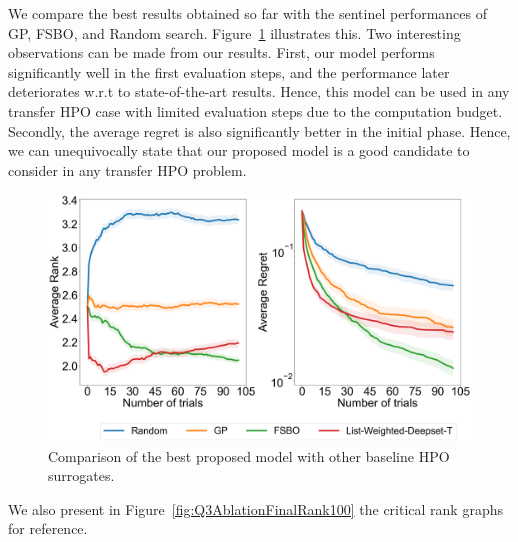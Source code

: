\documentclass[12pt, twoside, ngerman]{report}
\begin{document}
We compare the best results obtained so far with the sentinel performances of GP,  FSBO,  and Random search. Figure~\ref{fig:Q3AblationFinal} illustrates this.  Two interesting observations can be made from our results. First,  our model performs significantly well in the first evaluation steps, and the performance later deteriorates w.r.t to state-of-the-art results. Hence,  this model can be used in any transfer HPO case with limited evaluation steps due to the computation budget. Secondly,   the average regret is also significantly better in the initial phase. Hence, we can unequivocally state that our proposed model is a good candidate to consider in any transfer HPO problem. 

\begin{figure}[h]
  \centering
    \includegraphics[scale=0.25]{images/Q3AblationFinal}
    \caption{Comparison of the best proposed model with other baseline HPO surrogates.}
    \label{fig:Q3AblationFinal}
\end{figure}

We also present in Figure~\ref{fig:Q3AblationFinalRank100} the critical rank graphs for reference.
\end{document}
